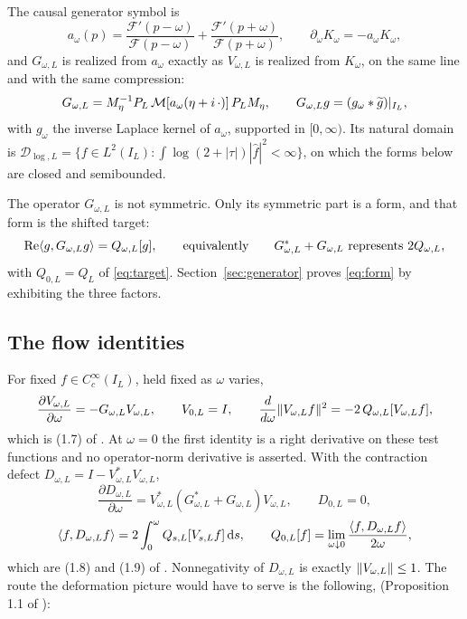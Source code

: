 \begin{definition}\label{def:generator}
The causal generator symbol is
\begin{equation}\label{eq:gensymbol}
 a_\omega(p)=\frac{\mathcal F'(p-\omega)}{\mathcal F(p-\omega)}
 +\frac{\mathcal F'(p+\omega)}{\mathcal F(p+\omega)},
 \qquad \partial_\omega K_\omega=-a_\omega K_\omega ,
\end{equation}
and $G_{\omega,L}$ is realized from $a_\omega$ exactly as $V_{\omega,L}$ is
realized from $K_\omega$, on the same line and with the same compression:
\begin{equation}\label{eq:generator}
 G_{\omega,L}=M_\eta^{-1}P_L\,\mathcal M[a_\omega(\eta+i\,\cdot)]\,P_LM_\eta ,
 \qquad G_{\omega,L}g=(g_\omega*\widetilde g)|_{I_L},
\end{equation}
with $g_\omega$ the inverse Laplace kernel of $a_\omega$, supported in
$[0,\infty)$. Its natural domain is
$\mathcal D_{\log,L}=\{f\in L^2(I_L):\int\log(2+|\tau|)|\widehat f|^2<\infty\}$,
on which the forms below are closed and semibounded.
\end{definition}

The operator $G_{\omega,L}$ is not symmetric. Only its symmetric part is a form,
and that form is the shifted target:
\begin{equation}\label{eq:form}
 \operatorname{Re}\langle g,G_{\omega,L}g\rangle=Q_{\omega,L}[g],
 \qquad\text{equivalently}\qquad
 G_{\omega,L}^*+G_{\omega,L}\ \text{represents}\ 2Q_{\omega,L},
\end{equation}
with $Q_{0,L}=Q_L$ of \eqref{eq:target}. Section~\ref{sec:generator} proves
\eqref{eq:form} by exhibiting the three factors.

\subsection{The flow identities}

For fixed $f\in C_c^\infty(I_L)$, held fixed as $\omega$ varies,
\begin{equation}\label{eq:flow}
 \frac{\partial V_{\omega,L}}{\partial\omega}=-G_{\omega,L}V_{\omega,L},
 \qquad V_{0,L}=I,
 \qquad
 \frac{d}{d\omega}\lVert V_{\omega,L}f\rVert^2=-2\,Q_{\omega,L}[V_{\omega,L}f],
\end{equation}
which is (1.7) of \cite{Background}. At $\omega=0$ the first identity is a right
derivative on these test functions and no operator-norm derivative is asserted.
With the contraction defect $D_{\omega,L}=I-V_{\omega,L}^*V_{\omega,L}$,
\begin{equation}\label{eq:defect}
 \frac{\partial D_{\omega,L}}{\partial\omega}
 =V_{\omega,L}^*(G_{\omega,L}^*+G_{\omega,L})V_{\omega,L},
 \qquad D_{0,L}=0,
\end{equation}
\begin{equation}\label{eq:storage}
 \langle f,D_{\omega,L}f\rangle=2\int_0^\omega Q_{s,L}[V_{s,L}f]\,\mathrm d s,
 \qquad
 Q_{0,L}[f]=\lim_{\omega\downarrow0}\frac{\langle f,D_{\omega,L}f\rangle}{2\omega},
\end{equation}
which are (1.8) and (1.9) of \cite{Background}. Nonnegativity of $D_{\omega,L}$
is exactly $\lVert V_{\omega,L}\rVert\leq1$. The route the deformation picture would
have to serve is the following, (Proposition 1.1 of \cite{Background}):


